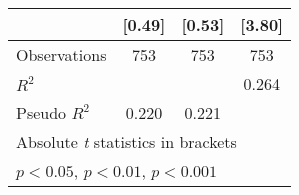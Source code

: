 {\begin{longtable}{l*{3}{c}}
                    &      [0.49]         &      [0.53]         &      [3.80]         \\
\hline
Observations        &         753         &         753         &         753         \\
\(R^{2}\)           &                     &                     &       0.264         \\
Pseudo \(R^{2}\)    &       0.220         &       0.221         &                     \\
\hline\hline
\multicolumn{4}{l}{\footnotesize Absolute \textit{t} statistics in brackets}\\
\multicolumn{4}{l}{\footnotesize \sym{*} \(p<0.05\), \sym{**} \(p<0.01\), \sym{***} \(p<0.001\)}\\
\end{longtable}
}
